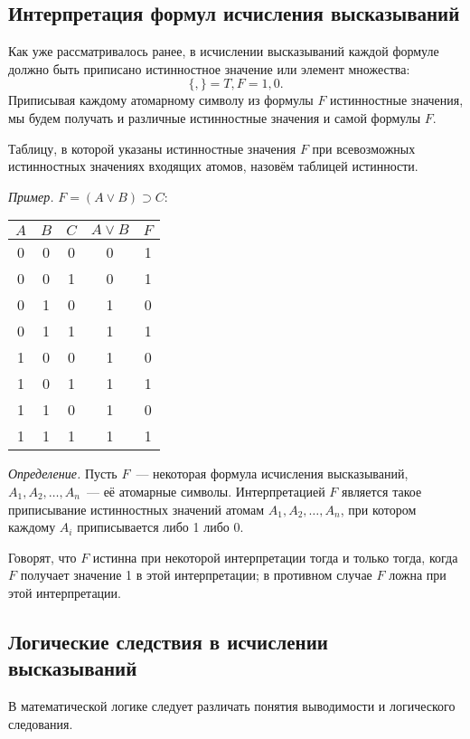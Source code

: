 \documentclass[a4paper,12pt]{report}
\begin{document}
\subsection{Интерпретация формул исчисления высказываний}
	Как уже рассматривалось ранее, в исчислении высказываний каждой формуле
	должно быть приписано истинностное значение или элемент множества:
	$$ \{,\} = {T, F} = {1, 0}. $$
	Приписывая каждому атомарному символу из формулы $ F $ истинностные значения,
	мы будем получать и различные истинностные значения и самой формулы $ F $.

	Таблицу, в которой указаны истинностные значения $ F $ при всевозможных
	истинностных значениях входящих атомов, назовём таблицей истинности.

	\textit{Пример.} $ F = (A \vee B) \supset C: $
	\begin{center}
		\begin{tabular}{ | c | c | c || c | c | }
			\hline
			$A$ & $B$ & $C$ & $A \vee B$ & $F$ \\
			\hline \hline
			0 & 0 & 0 & 0 & 1 \\
			\hline
			0 & 0 & 1 & 0 & 1 \\
			\hline
			0 & 1 & 0 & 1 & 0 \\
			\hline
			0 & 1 & 1 & 1 & 1 \\
			\hline
			1 & 0 & 0 & 1 & 0 \\
			\hline
			1 & 0 & 1 & 1 & 1 \\
			\hline
			1 & 1 & 0 & 1 & 0 \\
			\hline
			1 & 1 & 1 & 1 & 1 \\
			\hline
		\end{tabular}
	\end{center}

	\textit{Определение.} Пусть $ F $~--- некоторая формула исчисления
	высказываний, $ A_1, A_2, \dots, A_n $~--- её атомарные символы.
	Интерпретацией $ F $ является такое приписывание истинностных значений
	атомам $ A_1, A_2, \dots, A_n $, при котором каждому $ A_i $ приписывается
	либо 1 либо 0.

	Говорят, что $ F $ истинна при некоторой интерпретации тогда и только тогда,
	когда $ F $ получает значение 1 в этой интерпретации; в противном случае
	$ F $ ложна при этой интерпретации.


\subsection{Логические следствия в исчислении высказываний}
	В математической логике следует различать понятия выводимости и логического
	следования.
\end{document}
